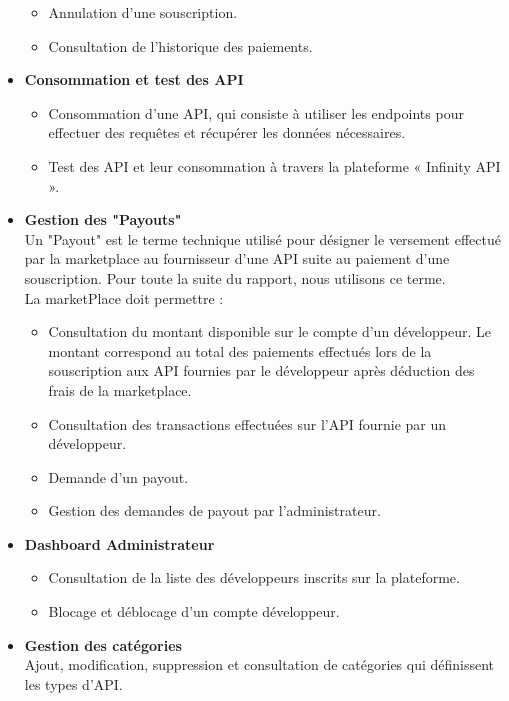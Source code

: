 \begin{itemize}
\begin{itemize}
              \item Annulation d’une souscription.
              \item Consultation de l'historique des paiements.
          \end{itemize}
    \item \textbf{Consommation et test des API}
          \begin{itemize}
              \item Consommation d’une API, qui consiste à utiliser les endpoints pour effectuer des requêtes et récupérer les données nécessaires.
              \item Test des API et leur consommation à travers la plateforme « Infinity API ».
          \end{itemize}
    \item \textbf{Gestion des "Payouts"} \\
          Un "Payout" est le terme technique utilisé pour désigner le versement effectué par la marketplace au fournisseur d'une API suite au paiement d'une souscription. Pour toute la suite du rapport, nous utilisons ce terme. \\
          La marketPlace doit permettre :
          \begin{itemize}
              \item Consultation du montant disponible sur le compte d’un développeur. Le montant correspond au total des paiements effectués lors de la souscription aux API fournies par le développeur après déduction des frais de la marketplace.          
              \item Consultation des transactions effectuées sur l’API fournie par un développeur.
              \item Demande d’un payout. 
              \item Gestion des demandes de payout par l'administrateur.
            \end{itemize}
    \item \textbf{Dashboard Administrateur}
          \begin{itemize}
              \item Consultation de la liste des développeurs inscrits sur la plateforme.
              \item Blocage et déblocage d’un compte développeur.
          \end{itemize}
    \item \textbf{Gestion des catégories} \\
    Ajout, modification, suppression et consultation de catégories qui définissent les types d'API.

\end{itemize}
